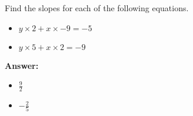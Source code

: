  Find the slopes for each of the following equations. \begin{itemize}\item \( y \times 2 + x \times -9 = -5 \)\item \( y \times 5 + x \times 2 = -9 \)\end{itemize}

        \textbf{Answer:} \begin{itemize}\item \( \frac{9}{2} \)\item \( -\frac{2}{5} \)\end{itemize}
